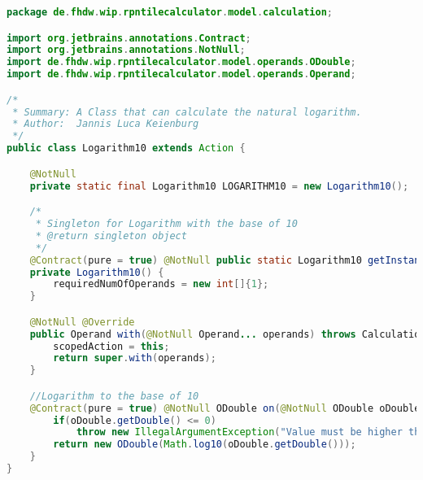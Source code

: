 \begin{lstlisting}[caption=Logarithm10 (Keienburg),label=list:Logarithm10,language=Java]
package de.fhdw.wip.rpntilecalculator.model.calculation;

import org.jetbrains.annotations.Contract;
import org.jetbrains.annotations.NotNull;
import de.fhdw.wip.rpntilecalculator.model.operands.ODouble;
import de.fhdw.wip.rpntilecalculator.model.operands.Operand;

/*
 * Summary: A Class that can calculate the natural logarithm.
 * Author:  Jannis Luca Keienburg
 */
public class Logarithm10 extends Action {

    @NotNull
    private static final Logarithm10 LOGARITHM10 = new Logarithm10();

    /*
     * Singleton for Logarithm with the base of 10
     * @return singleton object
     */
    @Contract(pure = true) @NotNull public static Logarithm10 getInstance() { return LOGARITHM10; }
    private Logarithm10() {
        requiredNumOfOperands = new int[]{1};
    }

    @NotNull @Override
    public Operand with(@NotNull Operand... operands) throws CalculationException {
        scopedAction = this;
        return super.with(operands);
    }

    //Logarithm to the base of 10
    @Contract(pure = true) @NotNull ODouble on(@NotNull ODouble oDouble) {
        if(oDouble.getDouble() <= 0)
            throw new IllegalArgumentException("Value must be higher than Zero.");
        return new ODouble(Math.log10(oDouble.getDouble()));
    }
}
\end{lstlisting}  

